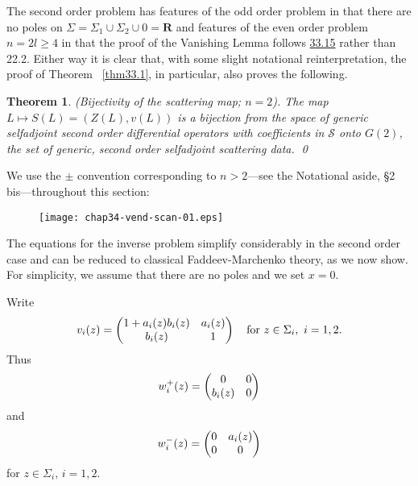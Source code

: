 \documentclass{surv-l}
\theoremstyle{plain}
\newtheorem{theorem}{Theorem}[section]
\theoremstyle{definition}
\numberwithin{equation}{chapter}
\begin{document}
The second order problem has features of the odd order problem in that there are no poles on $\Sigma=\Sigma_{1}\cup\Sigma_{2}\cup 0=\mathbf{R}$ and features of the even order problem $n=2l\geq 4$ in that the proof of the Vanishing Lemma follows \hyperref[vlem33.15]{33.15} rather than 22.2. Either way it is clear that, with some slight notational reinterpretation, the proof of Theorem ~\ref{thm33.1}, in particular, also proves the following.
\renewcommand\thetheorem{34.\arabic{theorem}}
\begin{theorem}\label{eq34.1}
\emph{(Bijectivity of the scattering map; $n=2$)}. The map $ L\mapsto S(L)=(Z(L), v(L))$ is a bijection from the space of generic selfadjoint second order differential operators with coefficients in $\mathscr{S}$ onto $G(2)$, the set of generic, second order selfadjoint scattering data. \qed
\end{theorem}

We use the $\pm$ convention corresponding to $n> 2$---see the Notational aside, \S 2 bis---throughout this section:


\begin{figure}
\texttt{[image: chap34-vend-scan-01.eps]}
\caption{}
\end{figure}

The equations for the inverse problem simplify considerably in the second order case and can be reduced to classical Faddeev-Marchenko theory, as we now show. For simplicity, we assume that there are no poles and we set $x=0$.

Write
\begin{equation*}
v_{i}(z)=\left(\begin{array}{@{}cc@{}}
1+  a_{i}(z)b_{i}(z) & a_{i}(z)\\
  b_{i}(z) & 1
\end{array}\right)\quad \mathrm{for}\ z\in\Sigma_{i},\ i=1,2.
\end{equation*}
Thus
\begin{equation*}
w_{i}^{+}(z)=\left(\begin{array}{@{}cc@{}}
0 & 0\\
b_{i}(z) & 0
\end{array}\right)
\end{equation*}
and
\begin{equation*}
w_{i}^{-}(z)=\left(\begin{array}{@{}cc@{}}
0 & a_{i}(z)\\
0 & 0
\end{array}\right)
\end{equation*}
for $z\in\Sigma_{i},\, i=1,2$.
\end{document}
